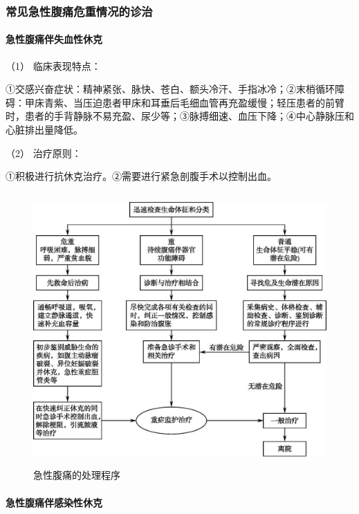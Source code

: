 \subsubsection{常见急性腹痛危重情况的诊治}

\paragraph{急性腹痛伴失血性休克}

\hypertarget{text00026.htmlux5cux23CHP1-10-3-2-1-1}{}
（1） 临床表现特点：

①交感兴奋症状：精神紧张、脉快、苍白、额头冷汗、手指冰冷；②末梢循环障碍：甲床青紫、当压迫患者甲床和耳垂后毛细血管再充盈缓慢；轻压患者的前臂时，患者的手背静脉不易充盈、尿少等；③脉搏细速、血压下降；④中心静脉压和心脏排出量降低。

\hypertarget{text00026.htmlux5cux23CHP1-10-3-2-1-2}{}
（2） 治疗原则：

①积极进行抗休克治疗。②需要进行紧急剖腹手术以控制出血。

\begin{figure}[!htbp]
 \centering
 \includegraphics[width=4.71875in,height=4.10417in]{./images/Image00052.jpg}
 \captionsetup{justification=centering}
 \caption{急性腹痛的处理程序}
 \label{fig10-1}
  \end{figure} 

\paragraph{急性腹痛伴感染性休克}

